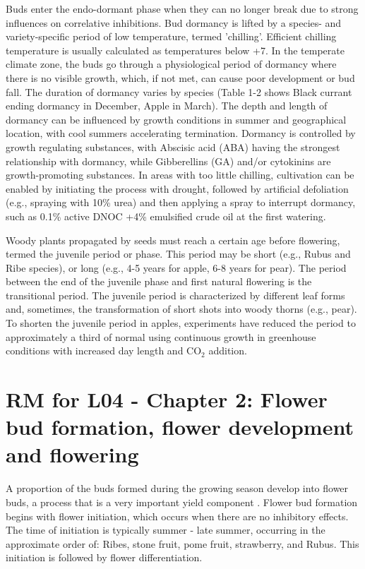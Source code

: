 \vspace{0.5em}
Buds enter the endo-dormant phase when they can no longer break due to strong influences on correlative inhibitions. Bud dormancy is lifted by a species- and variety-specific period of low temperature, termed 'chilling'. Efficient chilling temperature is usually calculated as temperatures below +7\textdegree. In the temperate climate zone, the buds go through a physiological period of dormancy where there is no visible growth, which, if not met, can cause poor development or bud fall. The duration of dormancy varies by species (Table 1-2 shows Black currant ending dormancy in December, Apple in March). The depth and length of dormancy can be influenced by growth conditions in summer and geographical location, with cool summers accelerating termination. Dormancy is controlled by growth regulating substances, with Abscisic acid (ABA) having the strongest relationship with dormancy, while Gibberellins (GA) and/or cytokinins are growth-promoting substances. In areas with too little chilling, cultivation can be enabled by initiating the process with drought, followed by artificial defoliation (e.g., spraying with 10\% urea) and then applying a spray to interrupt dormancy, such as 0.1\% active DNOC +4\% emulsified crude oil at the first watering.

\vspace{0.5em}
Woody plants propagated by seeds must reach a certain age before flowering, termed the juvenile period or phase. This period may be short (e.g., Rubus and Ribe species), or long (e.g., 4-5 years for apple, 6-8 years for pear). The period between the end of the juvenile phase and first natural flowering is the transitional period. The juvenile period is characterized by different leaf forms and, sometimes, the transformation of short shots into woody thorns (e.g., pear). To shorten the juvenile period in apples, experiments have reduced the period to approximately a third of normal using continuous growth in greenhouse conditions with increased day length and CO$_2$ addition.


\section{RM for L04 - Chapter 2: Flower bud formation, flower development and flowering}

A proportion of the buds formed during the growing season develop into flower buds, a process that is a very important yield component \cite*{rm_03_L04_flower_bud_formation}. Flower bud formation begins with flower initiation, which occurs when there are no inhibitory effects. The time of initiation is typically summer - late summer, occurring in the approximate order of: Ribes, stone fruit, pome fruit, strawberry, and Rubus. This initiation is followed by flower differentiation.

